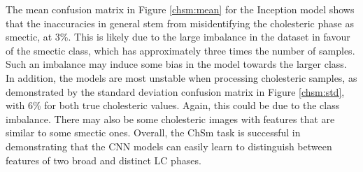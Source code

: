 \documentclass[12pt]{article}
\begin{document}
The mean confusion matrix in Figure \ref{chsm:mean} for the Inception model shows that the inaccuracies in general stem from misidentifying the cholesteric phase as smectic, at 3\%. This is likely due to the large imbalance in the dataset in favour of the smectic class, which has approximately three times the number of samples. Such an imbalance may induce some bias in the model towards the larger class. In addition, the models are most unstable when processing cholesteric samples, as demonstrated by the standard deviation confusion matrix in Figure \ref{chsm:std}, with 6\% for both true cholesteric values. Again, this could be due to the class imbalance. There may also be some cholesteric images with features that are similar to some smectic ones. Overall, the ChSm task is successful in demonstrating that the CNN models can easily learn to distinguish between features of two broad and distinct LC phases.
\end{document}
